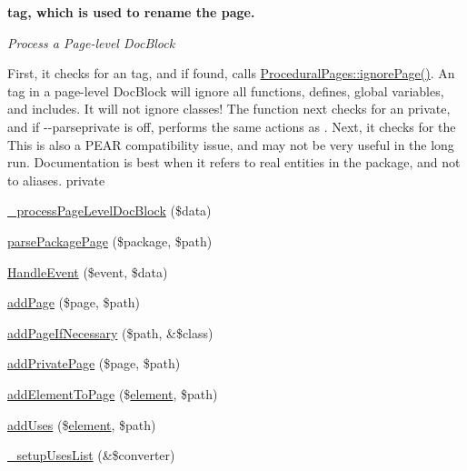 \begin{Indent}{\bf tag, which is used to rename the page.}\par
{\em \-Process a \-Page-\/level \-Doc\-Block

\-First, it checks for an  tag, and if found, calls \hyperlink{class_procedural_pages_abf3350e9945324342e85c412a1c4e91d}{\-Procedural\-Pages\-::ignore\-Page()}. \-An  tag in a page-\/level \-Doc\-Block will ignore all functions, defines, global variables, and includes. \-It will not ignore classes! \-The function next checks for an  private, and if -\/-\/parseprivate is off, performs the same actions as . \-Next, it checks for the \-This is also a \-P\-E\-A\-R compatibility issue, and may not be very useful in the long run. \-Documentation is best when it refers to real entities in the package, and not to aliases.  private }\begin{DoxyCompactItemize}
\item 
\hyperlink{classphp_documentor___intermediate_parser_a525ab2ae42a9c0284d1cc606bc7c4331}{\-\_\-process\-Page\-Level\-Doc\-Block} (\$data)
\item 
\hyperlink{classphp_documentor___intermediate_parser_a121660ec0da1190e14caf30f86510e98}{parse\-Package\-Page} (\$package, \$path)
\item 
\hyperlink{classphp_documentor___intermediate_parser_a2315978686182f0bdb05425d81358b38}{\-Handle\-Event} (\$event, \$data)
\item 
\hyperlink{classphp_documentor___intermediate_parser_ab71ba3f8c009cd81d404c70f324535bd}{add\-Page} (\$page, \$path)
\item 
\hyperlink{classphp_documentor___intermediate_parser_ad879c3077fb3506e973595dd1edc1194}{add\-Page\-If\-Necessary} (\$path, \&\$class)
\item 
\hyperlink{classphp_documentor___intermediate_parser_a6c3ec9384380512619f3b99da8a33442}{add\-Private\-Page} (\$page, \$path)
\item 
\hyperlink{classphp_documentor___intermediate_parser_a472495aecca12ff9b77368f1b2bb0415}{add\-Element\-To\-Page} (\$\hyperlink{bug-904820_8php_aa94081298ab2dfd0f261cce6c203d9aa}{element}, \$path)
\item 
\hyperlink{classphp_documentor___intermediate_parser_af0d519d569dc73365f131f33d6f4abe7}{add\-Uses} (\$\hyperlink{bug-904820_8php_aa94081298ab2dfd0f261cce6c203d9aa}{element}, \$path)
\item 
\hyperlink{classphp_documentor___intermediate_parser_ab04c97c21cd676a519fc09ebdd316e60}{\-\_\-setup\-Uses\-List} (\&\$converter)

\end{DoxyCompactItemize}
\end{Indent}
